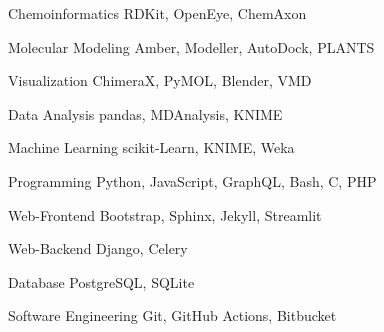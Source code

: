 \vspace{2.3mm}

\begin{cvskills}


    \cvskill
	{Chemoinformatics}
    {RDKit, OpenEye, ChemAxon}

    \cvskill
	{Molecular Modeling}
    {Amber, Modeller, AutoDock, PLANTS}

    \cvskill
	{Visualization}
    {ChimeraX, PyMOL, Blender, VMD}


    \cvskill
	{Data Analysis}
    {pandas, MDAnalysis, KNIME}

    \cvskill
	{Machine Learning}
    {scikit-Learn, KNIME, Weka}


	\cvskill
	{Programming}
    {Python, JavaScript, GraphQL, Bash, C, PHP}

	\cvskill
    {Web-Frontend}
    {Bootstrap, Sphinx, Jekyll, Streamlit}

    \cvskill
    {Web-Backend}
    {Django, Celery}

	\cvskill
    {Database}
    {PostgreSQL, SQLite}

	\cvskill
    {Software Engineering}
    {Git, GitHub Actions, Bitbucket}

\end{cvskills}
